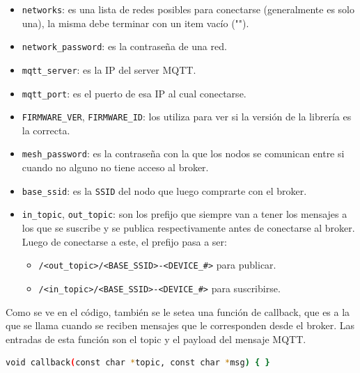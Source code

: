\begin{itemize}
  \item \lstinline[columns=fixed]{networks}: es una lista de redes posibles para conectarse (generalmente es solo una), la misma debe terminar con un item vacío ("").
  \item \lstinline[columns=fixed]{network_password}: es la contraseña de una red.
  \item \lstinline[columns=fixed]{mqtt_server}: es la IP del server MQTT.
  \item \lstinline[columns=fixed]{mqtt_port}: es el puerto de esa IP al cual conectarse.
  \item \lstinline[columns=fixed]{FIRMWARE_VER}, \lstinline[columns=fixed]{FIRMWARE_ID}: los utiliza para ver si la versión de la librería es la correcta.
  \item \lstinline[columns=fixed]{mesh_password}: es la contraseña con la que los nodos se comunican entre si cuando no alguno no tiene acceso al broker.
  \item \lstinline[columns=fixed]{base_ssid}: es la \lstinline[columns=fixed]{SSID} del nodo que luego comprarte con el broker.
  \item \lstinline[columns=fixed]{in_topic}, \lstinline[columns=fixed]{out_topic}: son los prefijo que siempre van a tener los mensajes a los que se suscribe y se publica respectivamente antes de conectarse al broker. Luego de conectarse a este, el prefijo pasa a ser:
  \begin{itemize}
    \item \lstinline[columns=fixed]{/<out_topic>/<BASE_SSID>-<DEVICE_#>} para publicar.
    \item \lstinline[columns=fixed]{/<in_topic>/<BASE_SSID>-<DEVICE_#>} para suscribirse.
  \end{itemize}
\end{itemize}

Como se ve en el código, también se le setea una función de callback, que es a la que se llama cuando se reciben mensajes que le corresponden desde el broker. Las entradas de esta función son el topic y el payload del mensaje MQTT. 

\begin{lstlisting}[language=bash]
void callback(const char *topic, const char *msg) { }
\end{lstlisting}

